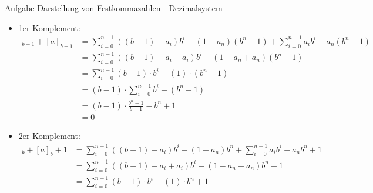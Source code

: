 \begin{frame}[allowframebreaks]{Aufgabe \thesection}{Darstellung von Festkommazahlen - Dezimalsystem}
  \if{}\fi
  \begin{solutionnoinc}
    \begin{itemize}
        \item \alert{1er-Komplement:} \tiny
        \vspace{-0.5cm}
        \begin{align*}
            [a^{\prime}]_{b-1}+[a]_{b-1}&=\sum_{i=0}^{n-1}((b-1) - a_{i})b^{i}-(1-a_{n})(b^{n}-1)+\sum_{i=0}^{n-1}a_{i}b^{i}-a_{n}(b^{n}-1)\\
            &=\sum_{i=0}^{n-1}((b-1)-a_{i}+a_{i}){b^{i}}-(1-a_{n}+a_{n})(b^{n}-1)\\
            &=\sum_{i=0}^{n-1}(b-1)\cdot b^{i}-(1)\cdot (b^{n}-1)\\
            &=(b-1)\cdot\sum_{i=0}^{n-1}b^{i}-(b^{n}-1)\\
            &=(b-1)\cdot\frac{b^{n}-1}{b-1}-b^{n}+1\\
            &=0
        \end{align*}
    \end{itemize}
  \end{solutionnoinc}
  \begin{solution}
    \begin{itemize}
        \item \alert{2er-Komplement:} \tiny
        \vspace{-0.5cm}
        \begin{align*}
            [a^{\prime}]_{b}+[a]_{b}+1&=\sum_{i=0}^{n-1}((b-1)-a_{i})b^{i}-(1-a_{n})b^{n}+\sum_{i=0}^{n-1}a_{i}b^{i}-a_{n}b^{n}+1\\
            &=\sum_{i=0}^{n-1}((b-1)-a_{i}+a_{i}){b^{i}}-(1-a_{n}+a_{n}){b^{n}}+1\\
            &=\sum_{i=0}^{n-1}(b-1)\cdot b^{i}-(1)\cdot b^{n}+1\\

\end{align*}
\end{itemize}
\end{solution}
\end{frame}
